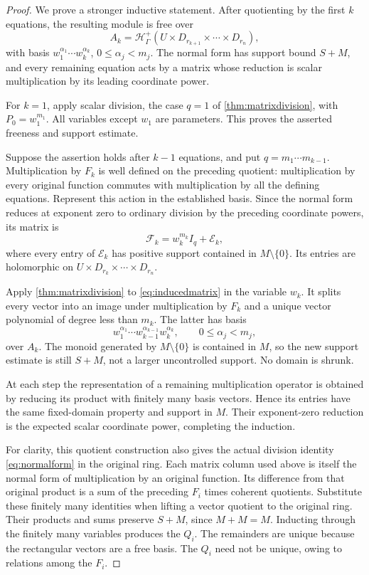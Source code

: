 \documentclass[11pt,oneside]{article}
\numberwithin{equation}{section}
\theoremstyle{definition}
\theoremstyle{remark}\newtheorem{remark}[theorem]{Remark}
\newcommand{\Hp}{\mathcal H^{+}_{\Gamma}}
\begin{document}
\begin{proof}
We prove a stronger inductive statement. After quotienting by the first \(k\) equations, the resulting module is free over
\[
 A_k=\Hp(U\times D_{r_{k+1}}\times\cdots\times D_{r_n}),
\]
with basis \(w_1^{\alpha_1}\cdots w_k^{\alpha_k}\), \(0\leq\alpha_j<m_j\). The normal form has support bound \(S+M\), and every remaining equation acts by a matrix whose reduction is scalar multiplication by its leading coordinate power.

For \(k=1\), apply scalar division, the case \(q=1\) of \cref{thm:matrixdivision}, with \(P_0=w_1^{m_1}\). All variables except \(w_1\) are parameters. This proves the asserted freeness and support estimate.

Suppose the assertion holds after \(k-1\) equations, and put \(q=m_1\cdots m_{k-1}\). Multiplication by \(F_k\) is well defined on the preceding quotient: multiplication by every original function commutes with multiplication by all the defining equations. Represent this action in the established basis. Since the normal form reduces at exponent zero to ordinary division by the preceding coordinate powers, its matrix is
\begin{equation}\label{eq:inducedmatrix}
 \mathcal F_k=w_k^{m_k}I_q+\mathcal E_k,
\end{equation}
where every entry of \(\mathcal E_k\) has positive support contained in \(M\setminus\{0\}\). Its entries are holomorphic on
\(U\times D_{r_k}\times\cdots\times D_{r_n}\).

Apply \cref{thm:matrixdivision} to \eqref{eq:inducedmatrix} in the variable \(w_k\). It splits every vector into an image under multiplication by \(F_k\) and a unique vector polynomial of degree less than \(m_k\). The latter has basis
\[
 w_1^{\alpha_1}\cdots w_{k-1}^{\alpha_{k-1}}w_k^{\alpha_k},
 \qquad 0\leq\alpha_j<m_j,
\]
over \(A_k\). The monoid generated by \(M\setminus\{0\}\) is contained in \(M\), so the new support estimate is still \(S+M\), not a larger uncontrolled support. No domain is shrunk.

At each step the representation of a remaining multiplication operator is obtained by reducing its product with finitely many basis vectors. Hence its entries have the same fixed-domain property and support in \(M\). Their exponent-zero reduction is the expected scalar coordinate power, completing the induction.

For clarity, this quotient construction also gives the actual division identity \eqref{eq:normalform} in the original ring. Each matrix column used above is itself the normal form of multiplication by an original function. Its difference from that original product is a sum of the preceding \(F_i\) times coherent quotients. Substitute these finitely many identities when lifting a vector quotient to the original ring. Their products and sums preserve \(S+M\), since \(M+M=M\). Inducting through the finitely many variables produces the \(Q_i\). The remainders are unique because the rectangular vectors are a free basis. The \(Q_i\) need not be unique, owing to relations among the \(F_i\).


\end{proof}
\end{document}
